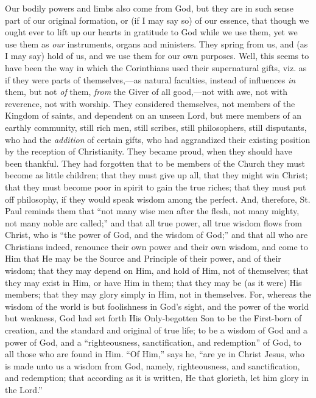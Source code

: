 Our bodily powers and limbs also come from God, but they are in
such sense part of our original formation, or (if I may say so) of our
essence, that though we ought ever to lift up our hearts in gratitude
to God while we use them, yet we use them as \emph{our} instruments,
organs and ministers. They spring from us, and (as I may say) hold of
us, and we use them for our own purposes. Well, this seems to have
been the way in which the Corinthians used their supernatural gifts,
viz. as if they were parts of themselves,—as natural faculties,
instead of influences \emph{in} them, but not \emph{of} them, \emph{from}
the Giver of all good,—not with awe, not with reverence, not with
worship. They considered themselves, not members of the Kingdom of
saints, and dependent on an unseen Lord, but mere members of an
earthly community, still rich men, still scribes, still philosophers,
still disputants, who had the \emph{addition} of certain gifts, who
had aggrandized their existing position by the reception of
Christianity. They became proud, when they should have been thankful.
They had forgotten that to be members of the Church they must become
as little children; that they must give up all, that they might win
Christ; that they must become poor in spirit to gain the true riches;
that they must put off philosophy, if they would speak wisdom among
the perfect. And, therefore, St. Paul reminds them that ``not many
wise men after the flesh, not many mighty, not many noble arc
called;'' and that all true power, all true wisdom flows from
Christ, who is ``the power of God, and the wisdom of God;''
and that all who are Christians indeed, renounce their own power and
their own wisdom, and come to Him that He may be the Source and
Principle of their power, and of their wisdom; that they may depend on
Him, and hold of Him, not of themselves; that they may exist in Him,
or have Him in them; that they may be (as it were) His members; that
they may glory simply in Him, not in themselves. For, whereas the
wisdom of the world is but foolishness in God's sight, and the power
of the world but weakness, God had set forth His Only-begotten Son to
be the First-born of creation, and the standard and original of true
life; to be a wisdom of God and a power of God, and a
``righteousness, sanctification, and redemption'' of God, to
all those who are found in Him. ``Of Him,'' says he, ``are
ye in Christ Jesus, who is made unto us a wisdom from God, namely,
righteousness, and sanctification, and redemption; that according as
it is written, He that glorieth, let him glory in the Lord.''

